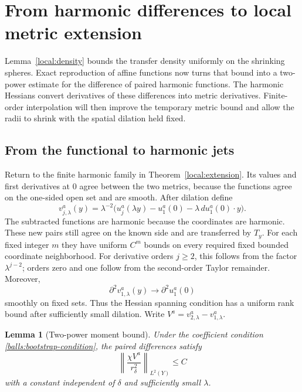 \documentclass[11pt]{article}
\newtheorem{lemma}[theorem]{Lemma}
\theoremstyle{definition}
\theoremstyle{remark}
\numberwithin{equation}{section}
\begin{document}
\section{From harmonic differences to local metric extension}\label{sec:bootstrap}

Lemma~\ref{local:density} bounds the transfer density uniformly on the
shrinking spheres.  Exact reproduction of affine functions now turns that
bound into a two-power estimate for the difference of paired harmonic
functions.  The harmonic Hessians convert derivatives of these differences
into metric derivatives.  Finite-order interpolation will then improve
the temporary metric bound and allow the radii to shrink with the spatial
dilation held fixed.

\subsection{From the functional to harmonic jets}

Return to the finite harmonic family in Theorem~\ref{local:extension}.
Its values and first derivatives at $0$ agree between the two metrics,
because the functions agree on the one-sided open set and are smooth.
After dilation define
\begin{equation}\label{local:renormalized-pairs}
 v_{j,\lambda}^a(y)=\lambda^{-2}
 \bigl(u_j^a(\lambda y)-u_1^a(0)
                     -\lambda\,du_1^a(0)\cdot y\bigr).
\end{equation}
The subtracted functions are harmonic because the coordinates are
harmonic.  These new pairs still agree on the known side and are
transferred by $T_y$.  For each fixed integer $m$ they have uniform
$C^m$ bounds on every required fixed bounded coordinate neighborhood.
For derivative orders $j\geq2$, this follows from the factor
$\lambda^{j-2}$; orders zero and one follow from the second-order
Taylor remainder.  Moreover,
\[
 \partial^2v_{1,\lambda}^a(y)\longrightarrow\partial^2u_1^a(0)
\]
smoothly on fixed sets.  Thus the Hessian spanning condition has a
uniform rank bound after sufficiently small dilation.  Write
$V^a=v_{2,\lambda}^a-v_{1,\lambda}^a$.

\begin{lemma}[Two-power moment bound]\label{local:moment}
Under the coefficient condition \eqref{balls:bootstrap-condition},
the paired differences satisfy
\begin{equation}\label{local:moment-bound}
 \left\|\frac{\chi V^a}{r_\delta^2}\right\|_{L^2(Y)}\leq C
\end{equation}
with a constant independent of $\delta$ and sufficiently small
$\lambda$.
\end{lemma}
\end{document}
